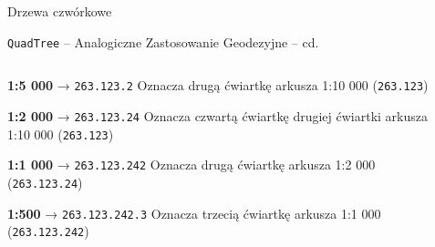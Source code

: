 \documentclass[aspectratio=1610, polish]{beamer}
\begin{document}
\begin{section}{Drzewa czwórkowe }
\begin{frame}{\texttt{QuadTree} -- Analogiczne Zastosowanie Geodezyjne -- cd.}
\begin{columns}[T]
\begin{column}{0.55\textwidth}
        \begin{itemize}
            \small{\item \textbf{1:5 000} → \texttt{263.123.2}  
            Oznacza drugą ćwiartkę arkusza 1:10 000 (\texttt{263.123})
            
            \item \textbf{1:2 000} → \texttt{263.123.24}  
            Oznacza czwartą ćwiartkę drugiej ćwiartki arkusza 1:10 000 (\texttt{263.123})
            
            \item \textbf{1:1 000} → \texttt{263.123.242}  
            Oznacza drugą ćwiartkę arkusza 1:2 000 (\texttt{263.123.24})
            
            \item \textbf{1:500} → \texttt{263.123.242.3}  
            Oznacza trzecią ćwiartkę arkusza 1:1 000 (\texttt{263.123.242})}
        \end{itemize}


    \end{column}

    \begin{column}{0.4\textwidth}
        \begin{center}
\end{center}
\end{column}
\end{columns}
\end{frame}
\end{section}
\end{document}
